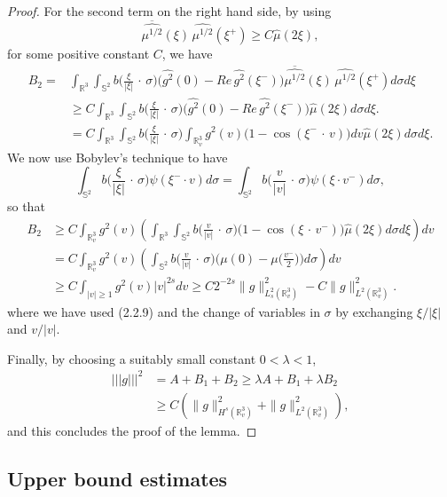 \documentclass{amsart}[12pt, article]
\begin{document}
\begin{proof}
For the second term on the right hand side, by using
$$
\overline{\widehat{\mu^{1/2}}}(\xi)\,
\widehat{\mu^{1/2}}(\xi^+)\geq C\widehat{\mu}(2\xi),
$$
for some positive constant $C$, we have
\begin{align*}
B_2=&\int_{{{{\mathbb R}}}^{3}}\int_{\mathbb S^{2}}
b\Big(\frac{\xi}{|\xi|}
\,\cdot\,\sigma\Big)\Big(\widehat{g^2}(0)-Re\, \widehat{g^2}(\xi^-)\Big)
\overline{\widehat{\mu^{1/2}}}(\xi)\,
\widehat{\mu^{1/2}}(\xi^+) d\sigma d \xi\\
&\geq C\int_{{{{\mathbb R}}}^{3}}\int_{\mathbb S^{2}}
b\Big(\frac{\xi}{|\xi|}
\,\cdot\,\sigma\Big)\Big(\widehat{g^2}(0)-Re\, \widehat{g^2}(\xi^-)\Big)
\widehat{\mu}(2\xi) d\sigma d \xi.
\\
&= C\int_{{{{\mathbb R}}}^{3}}\int_{\mathbb S^{2}}
b\Big(\frac{\xi}{|\xi|}
\,\cdot\,\sigma\Big)\int_{{{{\mathbb R}}}^3_v} g^2(v)\Big(1-\cos(\xi^-\,\cdot\, v)\Big)d v
\widehat{\mu}(2\xi) d\sigma d \xi.
\end{align*}
We now use Bobylev's technique \cite{bobylev} to have
\[
\int_{\mathbb S^{2}}
b\Big(\frac{\xi}{|\xi|}
\,\cdot\,\sigma\Big)\psi(\xi^-\cdot v)d\sigma
=\int_{\mathbb S^{2}}
b\Big(\frac{v}{|v|}
\,\cdot\,\sigma\Big)\psi(\xi\cdot v^-)d\sigma,
\]
so that
\begin{align*}
B_2
&\ge C\int_{{{{\mathbb R}}}^3_v} g^2(v) \left(
\int_{{{{\mathbb R}}}^{3}}\int_{\mathbb S^{2}}
b\Big(\frac{v}{|v|}
\,\cdot\,\sigma\Big)\Big(1-\cos(\xi\,\cdot\, v^-)\Big)
\widehat{\mu}(2\xi) d\sigma d \xi \right)d v\\
&=C\int_{{{{\mathbb R}}}^3_v} g^2(v) \left(
\int_{\mathbb S^{2}}
b\Big(\frac{v}{|v|}
\,\cdot\,\sigma\Big)\Big(
{\mu}(0) -{\mu} \big(\frac{v^-}{2}\big)\Big)
d\sigma  \right)d v\\
&\geq C \int_{|v|\geq 1} g^2(v)|v|^{2s}dv\geq C 2^{-2s}\|g\|^2_{L^2_s({{{\mathbb R}}}^3_v)}
-C\|g\|^2_{L^2({{{\mathbb R}}}^3_v)}.
\end{align*}
where 
we have used (2.2.9) and the change of variables in $\sigma$
by exchanging $\xi/|\xi|$ and $v/|v|$.

Finally, by choosing a suitably small constant $0<\lambda<1$,
\begin{align*}
||| g |||^2&=A+B_1+B_2 \geq \lambda A+B_1+\lambda B_2\\
&\geq C(\|g\|^2_{H^s({{{\mathbb R}}}^3_v)}+
\|g\|^2_{L^2({{{\mathbb R}}}^3_v)}),
\end{align*}
and this concludes the proof of the lemma.
\end{proof}

\subsection{Upper bound estimates}\label{section2.3}
\setcounter{equation}{0}
\smallskip
\end{document}

